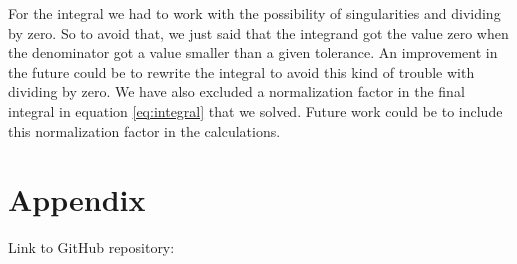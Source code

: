 \documentclass[12pt,a4paper,english]{article}
\begin{document}
For the integral we had to work with the possibility of singularities and dividing by zero. So to avoid that, we just said that the integrand got the value zero when the denominator got a value smaller than a given tolerance. An improvement in the future could be to rewrite the integral to avoid this kind of trouble with dividing by zero. We have also excluded a normalization factor in the final integral in equation \ref{eq:integral} that we solved. Future work could be to include this normalization factor in the calculations.

\appendix
\section{Appendix}
\label{sect:appendix}
Link to GitHub repository:\\



\end{document}
